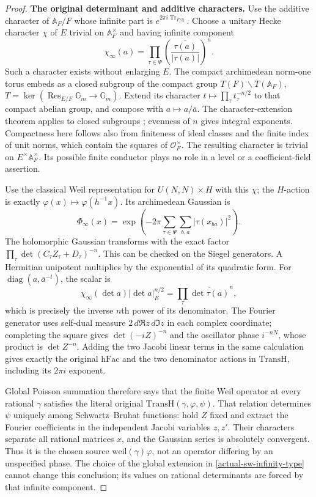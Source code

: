 \begin{proof}
\textbf{The original determinant and additive characters.}
Use the additive character of $\mathbb A_F/F$ whose infinite
part is $e^{2\pi i\operatorname{Tr}_{F/\mathbb Q}}$.
Choose a unitary Hecke character $\chi$ of $E$ trivial on
$\mathbb A_F^\times$ and having infinite component
\begin{equation}\label{actual-sw-infinity-type}
 \chi_\infty(a)=\prod_{\tau\in\Psi}
          \left(\frac{\overline{\tau(a)}}{|\tau(a)|}\right)^n.
\end{equation}
Such a character exists without enlarging $E$. The compact
archimedean norm-one torus embeds as a closed subgroup of the
compact group $T(F)\backslash T(\mathbb A_F)$,
$T=\ker(\operatorname{Res}_{E/F}\mathbb G_m\to\mathbb G_m)$.
Extend its character $t\mapsto\prod_\tau t_\tau^{-n/2}$ to that
compact abelian group, and compose with $a\mapsto a/\bar a$.
The character-extension theorem applies to closed subgroups
\cite{actual-sw-character-extension};
evenness of $n$ gives integral exponents. Compactness here follows
also from finiteness of ideal classes and the finite index of
unit norms, which contain the squares of $\mathcal O_F^\times$.
The resulting character is trivial on $E^\times\mathbb A_F^\times$.
Its possible finite conductor plays no role in a level or a
coefficient-field assertion.

Use the classical Weil representation for $U(N,N)\times H$
with this $\chi$; the $H$-action is exactly
$\varphi(x)\mapsto\varphi(h^{-1}x)$.
Its archimedean Gaussian is
\[
 \Phi_\infty(x)=
       \exp\left(-2\pi\sum_{\tau\in\Psi}\sum_{b,a}
                                      |\tau(x_{ba})|^2\right).
\]
The holomorphic Gaussian transforms with the exact factor
$\prod_\tau\det(C_\tau Z_\tau+D_\tau)^{-n}$.
This can be checked on the Siegel generators. A Hermitian
unipotent multiplies by the exponential of its quadratic form.
For $\operatorname{diag}(a,\bar a^{-t})$, the scalar is
\[
 \chi_\infty(\det a)|\det a|_E^{n/2}
            =\prod_\tau\overline{\det\tau(a)}^{n},
\]
which is precisely the inverse $n$th power of its denominator.
The Fourier generator uses self-dual measure $2\,d\Re z\,d\Im z$
in each complex coordinate; completing the square gives
$\det(-iZ)^{-n}$ and the oscillator phase $i^{-nN}$, whose
product is $\det Z^{-n}$. Adding the two Jacobi linear terms
in the same calculation gives exactly the original
$\mathrm{hFac}$ and the two denominator actions in
$\mathrm{TransH}$, including its $2\pi i$ exponent.

Global Poisson summation therefore says that the finite Weil
operator at every rational $\gamma$ satisfies the literal
original $\mathrm{TransH}(\gamma,\varphi,\psi)$.
That relation determines $\psi$ uniquely among Schwartz--Bruhat
functions: hold $Z$ fixed and extract the Fourier coefficients
in the independent Jacobi variables $z,z'$. Their characters
separate all rational matrices $x$, and the Gaussian series is
absolutely convergent. Thus it is the chosen source
$\mathrm{weil}(\gamma)\varphi$, not an operator differing by an
unspecified phase. The choice of the global extension in
\eqref{actual-sw-infinity-type} cannot change this conclusion;
its values on rational determinants are forced by that infinite
component.


\end{proof}
